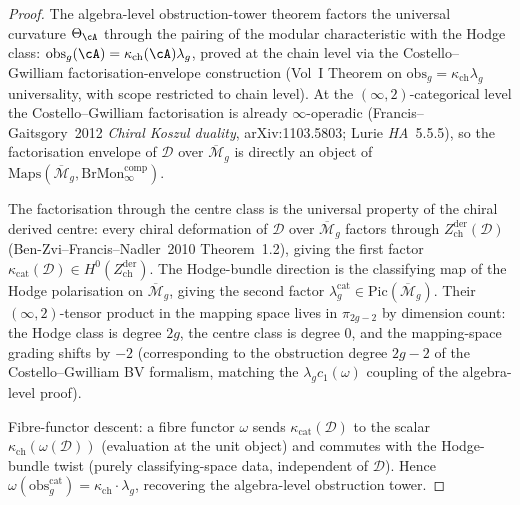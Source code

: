 \begin{proof}
The algebra-level obstruction-tower theorem factors the universal
curvature $\Theta_{\cA}$ through the pairing of the modular
characteristic with the Hodge class:
$\mathrm{obs}_g(\cA) = \kappa_{\mathrm{ch}}(\cA) \lambda_g$, proved at
the chain level via the Costello--Gwilliam factorisation-envelope
construction (Vol~I Theorem on
$\mathrm{obs}_g = \kappa_{\mathrm{ch}} \lambda_g$ universality, with scope restricted to chain level). At the
$(\infty,2)$-categorical level the Costello--Gwilliam factorisation is
already $\infty$-operadic (Francis--Gaitsgory~2012
\emph{Chiral Koszul duality}, arXiv:1103.5803; Lurie \emph{HA}~5.5.5),
so the factorisation envelope of $\mathcal D$ over
$\overline{\mathcal M}_g$ is directly an object of
$\mathrm{Maps}(\overline{\mathcal M}_g, \mathrm{BrMon}^{\mathrm{comp}}_\infty)$.

The factorisation through the centre class is the universal property of
the chiral derived centre: every chiral deformation of $\mathcal D$ over
$\overline{\mathcal M}_g$ factors through
$Z^{\mathrm{der}}_{\mathrm{ch}}(\mathcal D)$
(Ben-Zvi--Francis--Nadler~2010 Theorem~1.2), giving the first factor
$\kappa_{\mathrm{cat}}(\mathcal D) \in H^0(Z^{\mathrm{der}}_{\mathrm{ch}})$.
The Hodge-bundle direction is the classifying map of the Hodge
polarisation on $\overline{\mathcal M}_g$, giving the second factor
$\lambda_g^{\mathrm{cat}} \in \mathrm{Pic}(\overline{\mathcal M}_g)$.
Their $(\infty,2)$-tensor product in the mapping space lives in
$\pi_{2g-2}$ by dimension count: the Hodge class is degree $2g$, the
centre class is degree $0$, and the mapping-space grading shifts by
$-2$ (corresponding to the obstruction degree $2g-2$ of the
Costello--Gwilliam BV formalism, matching the $\lambda_g c_1(\omega)$
coupling of the algebra-level proof).

Fibre-functor descent: a fibre functor $\omega$ sends
$\kappa_{\mathrm{cat}}(\mathcal D)$ to the scalar
$\kappa_{\mathrm{ch}}(\omega(\mathcal D))$ (evaluation at the unit
object) and commutes with the Hodge-bundle twist (purely
classifying-space data, independent of $\mathcal D$). Hence
$\omega(\mathrm{obs}_g^{\mathrm{cat}}) = \kappa_{\mathrm{ch}} \cdot \lambda_g$,
recovering the algebra-level obstruction tower.
\end{proof}

